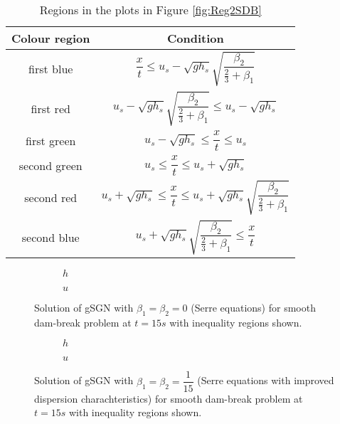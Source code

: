 \documentclass[10pt]{article}
\begin{document}
\begin{table}
	\centering
	\begin{tabular}{c | c}
	Colour region & Condition \\
	\hline
	first blue & $\dfrac{x}{t} \le u_s - \sqrt{gh_s} \sqrt{\dfrac{\beta_2}{\frac{2}{3} + \beta_1}} $ \\
	first red & $ u_s - \sqrt{gh_s} \sqrt{\dfrac{\beta_2}{\frac{2}{3} + \beta_1}} \le u_s - \sqrt{gh_s}$ \\
	first green & $u_s - \sqrt{gh_s} \le \dfrac{x}{t} \le u_{s}$ \\
	second green & $u_{s} \le \dfrac{x}{t}\le u_s + \sqrt{gh_s}$ \\
	second red & $  u_s + \sqrt{gh_s} \le \dfrac{x}{t} \le  u_{s} + \sqrt{g h_{s}}\sqrt{\dfrac{\beta_2}{\frac{2}{3} + \beta_1}} $ \\
	second blue & $u_{s} +  \sqrt{g h_{s}}\sqrt{\dfrac{\beta_2}{\frac{2}{3} + \beta_1}} \le \dfrac{x}{t} $
\end{tabular}
	\caption{Regions in the plots in Figure \ref{fig:Reg2SDB} 	\label{tab:regions2}}
\end{table}


 
\begin{figure}
	\centering
	\begin{subfigure}{0.49\textwidth}
		\centering
		
		\caption{$h$}
	\end{subfigure}
	\begin{subfigure}{0.49\textwidth}
		\centering
		
		\caption{$u$}
	\end{subfigure}
	\caption{Solution of gSGN with $\beta_1 = \beta_2 = 0$ (Serre equations) for smooth dam-break problem at $t=15s$ with inequality regions shown.}
	\label{fig:SerreSDB}
\end{figure}

\begin{figure}
	\centering
	\begin{subfigure}{0.49\textwidth}
		\centering
		
		\caption{$h$}
	\end{subfigure}
	\begin{subfigure}{0.49\textwidth}
		\centering
		
		\caption{$u$}
	\end{subfigure}
	\caption{Solution of gSGN with $\beta_1 = \beta_2 = \dfrac{1}{15}$ (Serre equations with improved dispersion charachteristics) for smooth dam-break problem at $t=15s$ with inequality regions shown.}
	\label{fig:SerreSDBImpDisp}
\end{figure}
\end{document}
